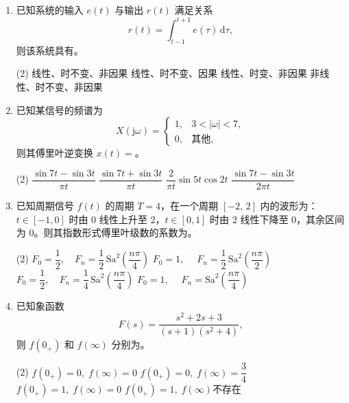 \documentclass[10pt,a4paper]{ctexart}
\newcommand{\fillblank}{\underline{\hspace{1.5cm}}}
\begin{document}
\begin{enumerate}[label=\arabic*.,leftmargin=*]

\item 已知系统的输入 $e(t)$ 与输出 $r(t)$ 满足关系
  \[
  r(t)=\int_{t-1}^{t+1} e(\tau)\,\mathrm{d}\tau,
  \]
  则该系统具有\fillblank。

  \begin{tasks}(2)
    \task 线性、时不变、非因果
    \task 线性、时不变、因果
    \task 线性、时变、非因果
    \task 非线性、时不变、非因果
  \end{tasks}

\item 已知某信号的频谱为
  \[
  X(\mathrm{j}\omega)=
  \begin{cases}
  1, & 3 < |\omega| < 7,\\[2pt]
  0, & \text{其他},
  \end{cases}
  \]
  则其傅里叶逆变换 $x(t)=$\fillblank。

  \begin{tasks}(2)
    \task $\dfrac{\sin 7t-\sin 3t}{\pi t}$
    \task $\dfrac{\sin 7t+\sin 3t}{\pi t}$
    \task $\dfrac{2}{\pi t}\sin 5t\cos 2t$
    \task $\dfrac{\sin 7t-\sin 3t}{2\pi t}$
  \end{tasks}

\item 已知周期信号 $f(t)$ 的周期 $T=4$，在一个周期 $[-2,\,2]$ 内的波形为：$t\in[-1,0]$ 时由 $0$ 线性上升至 $2$，$t\in[0,1]$ 时由 $2$ 线性下降至 $0$，其余区间为 $0$。则其指数形式傅里叶级数的系数为\fillblank。

  \begin{tasks}(2)
    \task $F_0=\dfrac12,\quad F_n=\dfrac12\,\mathrm{Sa}^2\!\left(\dfrac{n\pi}{4}\right)$
    \task $F_0=1,\quad\; F_n=\dfrac12\,\mathrm{Sa}^2\!\left(\dfrac{n\pi}{2}\right)$
    \task $F_0=\dfrac12,\quad F_n=\dfrac14\,\mathrm{Sa}^2\!\left(\dfrac{n\pi}{4}\right)$
    \task $F_0=1,\quad\; F_n=\mathrm{Sa}^2\!\left(\dfrac{n\pi}{4}\right)$
  \end{tasks}

\item 已知象函数
  \[
  F(s)=\frac{s^2+2s+3}{(s+1)(s^2+4)},
  \]
  则 $f(0_+)$ 和 $f(\infty)$ 分别为\fillblank。

  \begin{tasks}(2)
    \task $f(0_+)=0,\; f(\infty)=0$
    \task $f(0_+)=0,\; f(\infty)=\dfrac34$
    \task $f(0_+)=1,\; f(\infty)=0$
    \task $f(0_+)=1,\; f(\infty)\text{不存在}$
  \end{tasks}

\end{enumerate}
\end{document}
